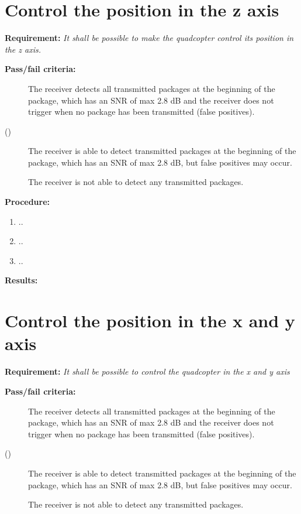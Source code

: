 \newpage

\section{Control the position in the z axis}
\textbf{Requirement:}
\textit{It shall be possible to make the quadcopter control its position in the z axis.}

\textbf{Pass/fail criteria:}
	\begin{description}
	\item[  ] The receiver detects all transmitted packages at the beginning of the package, which has an SNR of max 2.8 dB and the receiver does not trigger when no package has been transmitted (false positives).
	\item[()]The receiver is able to detect transmitted packages at the beginning of the package, which has an SNR of max 2.8 dB, but false positives may occur.
	\item[  \phantom{)}]The receiver is not able to detect any transmitted packages.
	\end{description}

		
\textbf{Procedure:}\\


\begin{enumerate}
	\item ..
	\item ..
	\item ..
\end{enumerate} 


\textbf{Results:}

\newpage

\section{Control the position in the x and y axis}
\textbf{Requirement:}
\textit{It shall be possible to control the quadcopter in the x and y axis}

\textbf{Pass/fail criteria:}
	\begin{description}
	\item[  ] The receiver detects all transmitted packages at the beginning of the package, which has an SNR of max 2.8 dB and the receiver does not trigger when no package has been transmitted (false positives).
	\item[()]The receiver is able to detect transmitted packages at the beginning of the package, which has an SNR of max 2.8 dB, but false positives may occur.
	\item[  \phantom{)}]The receiver is not able to detect any transmitted packages.
	\end{description}

